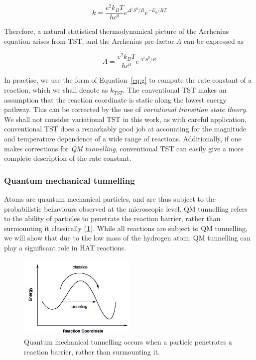\begin{doublespace}
\begin{equation}
  k = \frac{e^2k_B T}{hc^0}e^{\Delta^\ddagger S^0/R}e^{-E_a/RT}
\end{equation}

Therefore, a natural statistical thermodynamical picture of the Arrhenius
equation arises from TST, and the Arrhenius pre-factor $A$ can be expressed as

\begin{equation}
  A = \frac{e^2k_B T}{hc^0}e^{\Delta^\ddagger S^0/R}
\label{eq:afactor}
\end{equation}

In practise, we use the form of Equation~\ref{eq:g} to compute the rate
constant of a reaction, which we shall denote as $k_{TST}$. The conventional
TST makes an assumption that the reaction coordinate is static along the lowest
energy pathway. This can be corrected by the use of \emph{variational
transition state theory}.\cite{Truhlar1984} We shall not consider variational
TST in this work, as with careful application, conventional TST does a
remarkably good job at accounting for the magnitude and temperature dependence
of a wide range of reactions.\cite{Steinfeld1998} Additionally, if one makes
corrections for \emph{QM tunnelling}, conventional TST can easily give a more
complete description of the rate constant.

\subsubsection{Quantum mechanical tunnelling}

Atoms are quantum mechanical particles, and are thus subject to the
probabilistic behaviours observed at the microscopic level. QM tunnelling refers
to the ability of particles to penetrate the reaction barrier, rather than
surmounting it classically (\ref{fig:tunnelling}). While all reactions are
subject to QM tunnelling, we will show that due to the low mass of the hydrogen
atom, QM tunnelling can play a significant role in HAT reactions.

\begin{figure}[htb]
  \centering
  \includegraphics[width=0.5\textwidth]{figures/tunnelling-1}
  \caption{Quantum mechanical tunnelling occurs when a particle penetrates a
    reaction barrier, rather than surmounting it.}
\label{fig:tunnelling}
\end{figure}



\end{doublespace}
